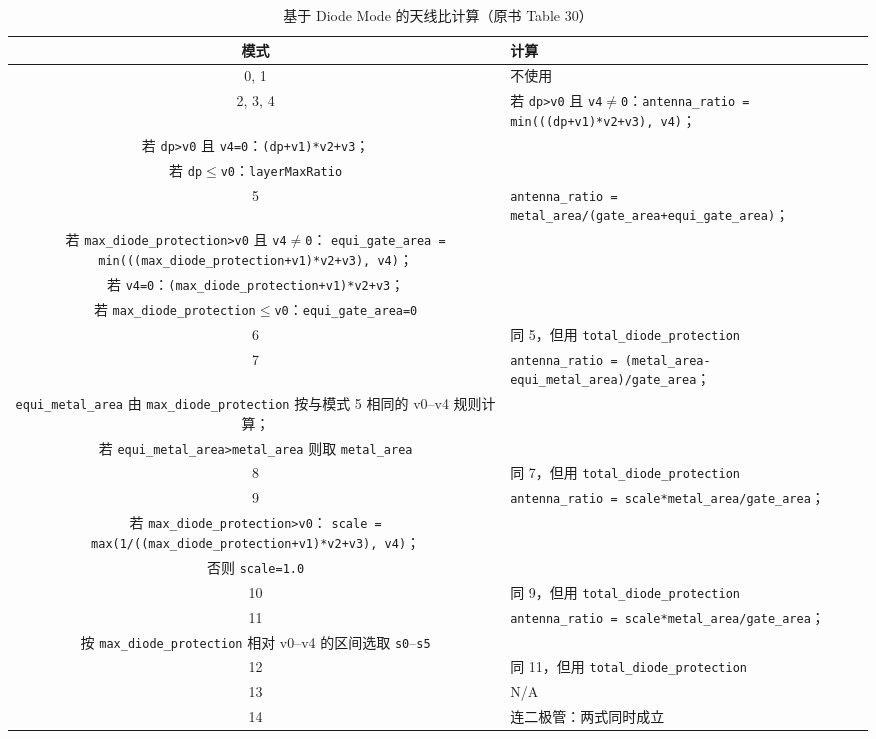 \begin{table}[htbp]
\centering
\caption{基于 Diode Mode 的天线比计算（原书 Table 30）}
\label{tab:antenna-ratio-calc}
\begin{tabular}{@{}cp{}@{}}
\toprule
模式 & 计算 \\
\midrule
0, 1 & 不使用 \\
2, 3, 4 &
若 \texttt{dp>v0} 且 \texttt{v4$\neq$0}：\texttt{antenna\_ratio = min(((dp+v1)*v2+v3), v4)}；\\
若 \texttt{dp>v0} 且 \texttt{v4=0}：\texttt{(dp+v1)*v2+v3}；\\
若 \texttt{dp$\leq$v0}：\texttt{layerMaxRatio} \\
5 & \texttt{antenna\_ratio = metal\_area/(gate\_area+equi\_gate\_area)}；\\
若 \texttt{max\_diode\_protection>v0} 且 \texttt{v4$\neq$0}：
\texttt{equi\_gate\_area = min(((max\_diode\_protection+v1)*v2+v3), v4)}；\\
若 \texttt{v4=0}：\texttt{(max\_diode\_protection+v1)*v2+v3}；\\
若 \texttt{max\_diode\_protection$\leq$v0}：\texttt{equi\_gate\_area=0} \\
6 & 同 5，但用 \texttt{total\_diode\_protection} \\
7 & \texttt{antenna\_ratio = (metal\_area-equi\_metal\_area)/gate\_area}；\\
\texttt{equi\_metal\_area} 由 \texttt{max\_diode\_protection} 按与模式 5 相同的 v0--v4 规则计算；\\
若 \texttt{equi\_metal\_area>metal\_area} 则取 \texttt{metal\_area} \\
8 & 同 7，但用 \texttt{total\_diode\_protection} \\
9 & \texttt{antenna\_ratio = scale*metal\_area/gate\_area}；\\
若 \texttt{max\_diode\_protection>v0}：
\texttt{scale = max(1/((max\_diode\_protection+v1)*v2+v3), v4)}；\\
否则 \texttt{scale=1.0} \\
10 & 同 9，但用 \texttt{total\_diode\_protection} \\
11 & \texttt{antenna\_ratio = scale*metal\_area/gate\_area}；\\
按 \texttt{max\_diode\_protection} 相对 v0--v4 的区间选取 \texttt{s0}--\texttt{s5} \\
12 & 同 11，但用 \texttt{total\_diode\_protection} \\
13 & N/A \\
14 & 连二极管：两式同时成立\\

\end{tabular}
\end{table}
